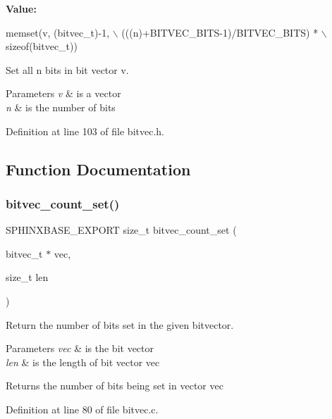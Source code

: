 {\bfseries Value\+:}
\begin{DoxyCode}
memset(v, (bitvec\_t)-1, \(\backslash\)
                                       (((n)+BITVEC\_BITS-1)/BITVEC\_BITS) * \(\backslash\)
                                       \textcolor{keyword}{sizeof}(bitvec\_t))
\end{DoxyCode}


Set all n bits in bit vector v. 


\begin{DoxyParams}{Parameters}
{\em v} & is a vector \\
\hline
{\em n} & is the number of bits \\
\hline
\end{DoxyParams}


Definition at line 103 of file bitvec.\+h.



\subsection{Function Documentation}
\mbox{\label{bitvec_8h_ac8eeaf487cd029e23fffe676f9a77a10}} 
\subsubsection{bitvec\+\_\+count\+\_\+set()}
{\footnotesize\ttfamily S\+P\+H\+I\+N\+X\+B\+A\+S\+E\+\_\+\+E\+X\+P\+O\+RT size\+\_\+t bitvec\+\_\+count\+\_\+set (\begin{DoxyParamCaption}\item[{bitvec\+\_\+t $\ast$}]{vec,  }\item[{size\+\_\+t}]{len }\end{DoxyParamCaption})}



Return the number of bits set in the given bitvector. 


\begin{DoxyParams}{Parameters}
{\em vec} & is the bit vector \\
\hline
{\em len} & is the length of bit vector {\ttfamily vec} \\
\hline
\end{DoxyParams}
\begin{DoxyReturn}{Returns}
the number of bits being set in vector {\ttfamily vec} 
\end{DoxyReturn}


Definition at line 80 of file bitvec.\+c.

